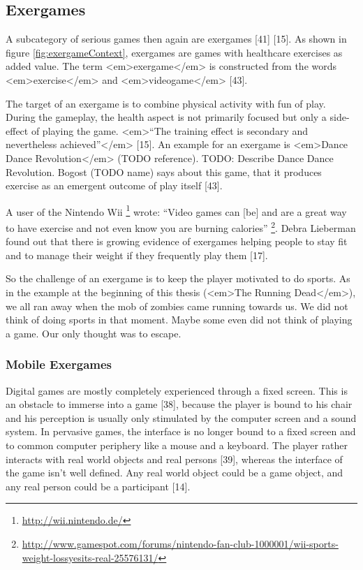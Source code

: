 \subsection{Exergames}
A subcategory of serious games then again are exergames [41] [15]. As shown in figure \ref{fig:exergameContext}, exergames are games with healthcare exercises as added value. The term <em>exergame</em> is constructed from the words <em>exercise</em> and <em>videogame</em> [43].

The target of an exergame is to combine physical activity with fun of play. During the gameplay, the health aspect is not primarily focused but only a side-effect of playing the game. <em>“The training effect is secondary and nevertheless achieved”</em> [15]. An example for an exergame is <em>Dance Dance Revolution</em> (TODO reference). TODO: Describe Dance Dance Revolution. Bogost (TODO name) says about this game, that it produces exercise as an emergent outcome of play itself [43].

A user of the Nintendo Wii \footnote{\url{http://wii.nintendo.de/}} wrote: “Video games can [be] and are a great way to have exercise and not even know you are burning calories” \footnote{\url{http://www.gamespot.com/forums/nintendo-fan-club-1000001/wii-sports-weight-lossyesits-real-25576131/}}. Debra Lieberman found out that there is growing evidence of exergames helping people to stay fit and to manage their weight if they frequently play them [17].

So the challenge of an exergame is to keep the player motivated to do sports. As in the example at the beginning of this thesis (<em>The Running Dead</em>), we all ran away when the mob of zombies came running towards us. We did not think of doing sports in that moment. Maybe some even did not think of playing a game. Our only thought was to escape.

\subsubsection{Mobile Exergames}
Digital games are mostly completely experienced through a fixed screen. This is an obstacle to immerse into a game [38], because the player is bound to his chair and his perception is usually only stimulated by the computer screen and a sound system. In pervasive games, the interface is no longer bound to a fixed screen and to common computer periphery like a mouse and a keyboard. The player rather interacts with real world objects and real persons [39], whereas the interface of the game isn’t well defined. Any real world object could be a game object, and any real person could be a participant [14].

